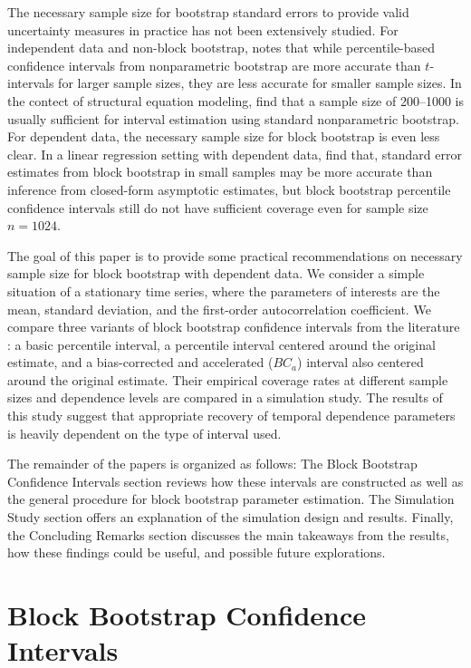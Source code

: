 \documentclass[12pt, letterpaper, titlepage]{article}
\begin{document}
The necessary sample size for bootstrap standard errors to provide valid
uncertainty measures in practice has not been extensively studied. For
independent data and non-block bootstrap, \citet{hesterberg2015teachers} notes
that while percentile-based confidence intervals from nonparametric bootstrap
are more accurate than $t$-intervals for larger sample sizes, they are
less accurate for smaller sample sizes. In the contect of structural equation
modeling, \citet{nevitt2001performance} find
that a sample size of 200--1000 is usually sufficient for interval estimation
using standard nonparametric bootstrap. For dependent data, the necessary sample
size for block bootstrap is even less clear. In a linear regression setting with
dependent data, \citet{goncalves2005bootstrap} find that, standard error
estimates from block bootstrap in small samples may be more accurate than
inference from closed-form asymptotic estimates, but block bootstrap percentile
confidence intervals still do not have sufficient coverage even for sample size
$n = 1024$.


The goal of this paper is to provide some practical recommendations on
necessary sample size for block bootstrap with dependent data. We consider a
simple situation of a stationary time series, where the parameters of
interests are the mean, standard deviation, and the first-order
autocorrelation coefficient. We compare three variants of block bootstrap
confidence intervals from the literature \citep{diciccio1996bootstrap}
\citep{rice2006mathematical}: a basic percentile interval, a percentile
interval centered around the original estimate, and a bias-corrected and
accelerated ($BC_a$) interval also centered around the original estimate. Their
empirical coverage rates at different sample sizes and dependence levels are
compared in a simulation study. The results of this study suggest that
appropriate recovery of temporal dependence parameters is heavily dependent on
the type of interval used.


The remainder of the papers is organized as follows:
The Block Bootstrap Confidence Intervals section reviews how these intervals
are constructed as well as the general procedure for block bootstrap parameter
estimation. The Simulation Study section offers an explanation of the
simulation design and results. Finally, the Concluding Remarks section
discusses the main takeaways from the results, how these findings could be
useful, and possible future explorations.


\section{Block Bootstrap Confidence Intervals}
\label{sec:blkbootreview}
\end{document}
